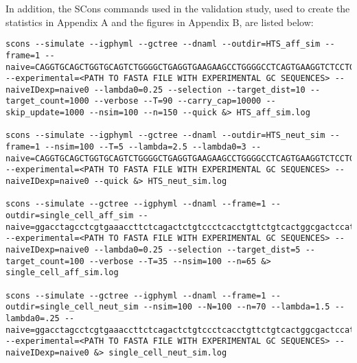 In addition, the SCons commands used in the validation study, used to create the statistics in Appendix A and the figures in Appendix B, are listed below:
\begin{lstlisting}
scons --simulate --igphyml --gctree --dnaml --outdir=HTS_aff_sim --frame=1 --naive=CAGGTGCAGCTGGTGCAGTCTGGGGCTGAGGTGAAGAAGCCTGGGGCCTCAGTGAAGGTCTCCTGCAAGGCTTCTGGATACACCTTCACCGGCTACTATATGCACTGGGTGCGACAGGCCCCTGGACAAGGGCTTGAGTGGATGGGATGGATCAACCCTAACAGTGGTGGCACAAACTATGCACAGAAGTTTCAGGGCAGGGTCACCATGACCAGGGACACGTCCATCAGCACAGCCTACATGGAGCTGAGCAGGCTGAGATCTGACGACACGGCCGTGTATTACTGTGCGAGAGGGCCATTCCCGAATTACTATGGTACGGGGAGTTATTGGGGGGGTTTTGACTACTGGGGCCAGGGAACCCTGGTCACCGTCTCCTCA --experimental=<PATH TO FASTA FILE WITH EXPERIMENTAL GC SEQUENCES> --naiveIDexp=naive0 --lambda0=0.25 --selection --target_dist=10 --target_count=1000 --verbose --T=90 --carry_cap=10000 --skip_update=1000 --nsim=100 --n=150 --quick &> HTS_aff_sim.log

scons --simulate --igphyml --gctree --dnaml --outdir=HTS_neut_sim --frame=1 --nsim=100 --T=5 --lambda=2.5 --lambda0=3 --naive=CAGGTGCAGCTGGTGCAGTCTGGGGCTGAGGTGAAGAAGCCTGGGGCCTCAGTGAAGGTCTCCTGCAAGGCTTCTGGATACACCTTCACCGGCTACTATATGCACTGGGTGCGACAGGCCCCTGGACAAGGGCTTGAGTGGATGGGATGGATCAACCCTAACAGTGGTGGCACAAACTATGCACAGAAGTTTCAGGGCAGGGTCACCATGACCAGGGACACGTCCATCAGCACAGCCTACATGGAGCTGAGCAGGCTGAGATCTGACGACACGGCCGTGTATTACTGTGCGAGAGGGCCATTCCCGAATTACTATGGTACGGGGAGTTATTGGGGGGGTTTTGACTACTGGGGCCAGGGAACCCTGGTCACCGTCTCCTCA --experimental=<PATH TO FASTA FILE WITH EXPERIMENTAL GC SEQUENCES> --naiveIDexp=naive0 --quick &> HTS_neut_sim.log

scons --simulate --gctree --igphyml --dnaml --frame=1 --outdir=single_cell_aff_sim --naive=ggacctagcctcgtgaaaccttctcagactctgtccctcacctgttctgtcactggcgactccatcaccagtggttactggaactggatccggaaattcccagggaataaacttgagtacatggggtacataagctacagtggtagcacttactacaatccatctctcaaaagtcgaatctccatcactcgagacacatccaagaaccagtactacctgcagttgaattctgtgactactgaggacacagccacatattactgt --experimental=<PATH TO FASTA FILE WITH EXPERIMENTAL GC SEQUENCES> --naiveIDexp=naive0 --lambda0=0.25 --selection --target_dist=5 --target_count=100 --verbose --T=35 --nsim=100 --n=65 &> single_cell_aff_sim.log

scons --simulate --gctree --igphyml --dnaml --frame=1 --outdir=single_cell_neut_sim --nsim=100 --N=100 --n=70 --lambda=1.5 --lambda0=.25 --naive=ggacctagcctcgtgaaaccttctcagactctgtccctcacctgttctgtcactggcgactccatcaccagtggttactggaactggatccggaaattcccagggaataaacttgagtacatggggtacataagctacagtggtagcacttactacaatccatctctcaaaagtcgaatctccatcactcgagacacatccaagaaccagtactacctgcagttgaattctgtgactactgaggacacagccacatattactgt --experimental=<PATH TO FASTA FILE WITH EXPERIMENTAL GC SEQUENCES> --naiveIDexp=naive0 &> single_cell_neut_sim.log

\end{lstlisting}





\clearpage
\newpage